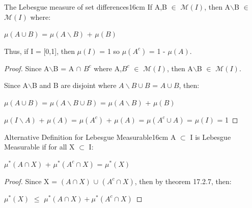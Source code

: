     \vspace{0.5cm}



    \begin{wtheorem}{The Lebesgue measure of set differences}{16cm}
        If A,B $\in$ $\mathcal{M}(I)$, then
        A$\backslash$B $\in$ $\mathcal{M}(I)$ where:

        \hspace{0.5cm}
        $\mu(A \cup B)$
        = $\mu(A \backslash B)$ + $\mu(B)$

        Thus, if I = [0,1], then $\mu(I)$ = 1 so $\mu(A^c)$ = 1 - $\mu(A)$.
    \end{wtheorem}

    \begin{proof}
        Since A$\backslash$B = A $\cap$ $B^c$ where
        A,$B^c$ $\in$ $\mathcal{M}(I)$, then
        A$\backslash$B $\in$ $\mathcal{M}(I)$.

        Since A$\backslash$B and B are disjoint where
        $A \backslash B \cup B$ = $A \cup B$, then:

        \hspace{0.5cm}
        $\mu(A \cup B)$
        = $\mu(A \backslash B \cup B)$
        = $\mu(A \backslash B)$ + $\mu(B)$

        \hspace{0.5cm}
        $\mu(I \backslash A)$ + $\mu(A)$
        = $\mu(A^c)$ + $\mu(A)$
        = $\mu(A^c \cup A)$
        = $\mu(I)$
        = 1
    \end{proof}

    \newpage



    \begin{wtheorem}{Alternative Definition for Lebesgue Measurable}{16cm}
        A $\subset$ I is Lebesgue Measurable if for all X $\subset$ I:

        \hspace{0.5cm}
        $\mu^*(A \cap X)$ + $\mu^*(A^c \cap X)$ = $\mu^*(X)$
    \end{wtheorem}

    \begin{proof}
        Since X = $(A \cap X)$ $\cup$ $(A^c \cap X)$, then
        by {\color{red} theorem 17.2.7}, then:

        \hspace{0.5cm}
        $\mu^*(X)$ $\leq$ $\mu^*(A \cap X) + \mu^*(A^c \cap X)$

        
    \end{proof}


